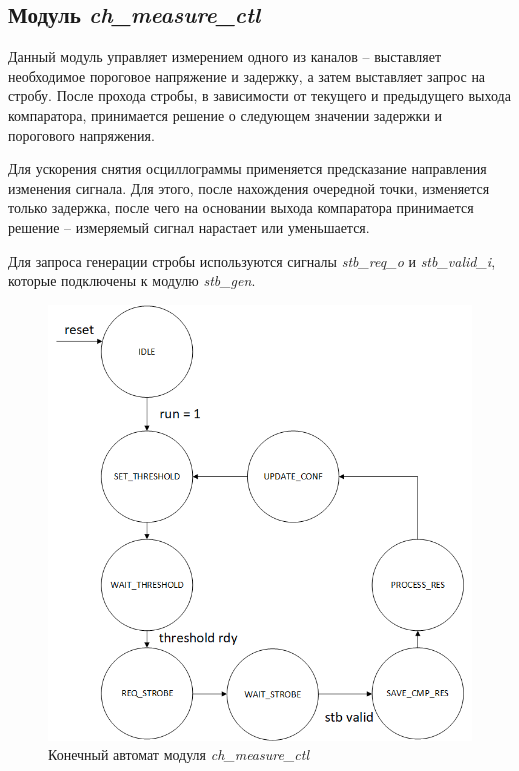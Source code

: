 \subsection{Модуль \emph{ch\_measure\_ctl}}

Данный модуль управляет измерением одного из каналов -- выставляет необходимое пороговое напряжение и задержку, а
затем выставляет запрос на стробу. После прохода стробы, в зависимости от текущего и предыдущего выхода компаратора, принимается решение
о следующем значении задержки и порогового напряжения.

Для ускорения снятия осциллограммы применяется предсказание направления изменения сигнала. Для этого, после нахождения очередной точки,
изменяется только задержка, после чего на основании выхода компаратора принимается решение -- измеряемый сигнал нарастает или уменьшается.

Для запроса генерации стробы используются сигналы \emph{stb\_req\_o} и \emph{stb\_valid\_i}, которые подключены к модулю \emph{stb\_gen}.

\begin{figure}[ht!] 
	\center
	\includegraphics  [scale=0.7] {my_folder/images//ch_ctl}
	\caption{Конечный автомат модуля \emph{ch\_measure\_ctl}} 
	\label{fig:ch-ctl-fsm}  
\end{figure}

